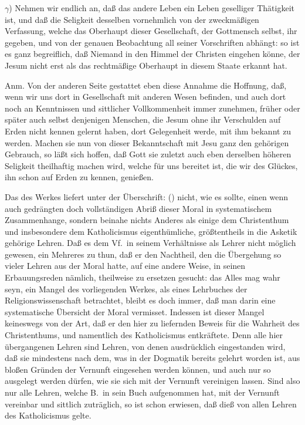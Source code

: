 {$\gamma$) Nehmen wir endlich an, daß das andere Leben ein Leben geselliger Thätigkeit ist, und daß die Seligkeit desselben vornehmlich von der zweckmäßigen Verfassung, welche das Oberhaupt dieser Gesellschaft, der Gottmensch selbst, ihr gegeben, und von der genauen Beobachtung all seiner Vorschriften abhängt: so ist es ganz begreiflich, daß Niemand in den Himmel der Christen eingehen könne, der Jesum nicht erst als das rechtmäßige Oberhaupt in diesem Staate erkannt hat. \par
Anm. Von der anderen Seite gestattet eben diese Annahme die Hoffnung, daß, wenn wir uns dort in Gesellschaft mit anderen Wesen befinden, und auch dort noch an Kenntnissen und sittlicher Vollkommenheit immer zunehmen, früher oder später auch selbst denjenigen Menschen, die Jesum ohne ihr Verschulden auf Erden nicht kennen gelernt haben, dort Gelegenheit werde, mit ihm bekannt zu werden. Machen sie nun von dieser Bekanntschaft mit Jesu ganz den gehörigen Gebrauch, so läßt sich hoffen, daß Gott sie zuletzt auch eben derselben höheren Seligkeit theilhaftig machen wird,  welche für uns bereitet ist, die wir des Glückes, ihn schon auf Erden zu kennen, genießen.} \par
\gliederungslinie\par
Das  des Werkes liefert unter der Überschrift:  () nicht, wie es sollte, einen wenn auch gedrängten doch vollständigen Abriß dieser Moral in systematischem Zusammenhange, sondern beinahe nichts Anderes als einige dem Christenthum und insbesondere dem Katholicismus eigenthümliche, größtentheils in die Asketik gehörige Lehren. Daß es dem Vf.\ in seinem Verhältnisse als Lehrer nicht möglich gewesen, ein Mehreres zu thun, daß er den Nachtheil, den die Übergehung so vieler Lehren aus der Moral hatte, auf eine andere Weise, in seinen Erbauungsreden nämlich, theilweise zu ersetzen gesucht: das Alles mag wahr seyn, ein Mangel des vorliegenden Werkes, als eines Lehrbuches der Religionswissenschaft betrachtet, bleibt es doch immer, daß man darin eine systematische Übersicht der Moral vermisset. Indessen ist dieser Mangel keineswegs von der Art, daß er den hier zu liefernden Beweis für die Wahrheit des Christenthums, und namentlich des Katholicismus entkräftete. Denn alle hier übergangenen Lehren sind Lehren, von denen ausdrücklich eingestanden wird, daß sie mindestens nach dem, was in der Dogmatik bereits gelehrt worden ist, aus bloßen Gründen der Vernunft eingesehen werden können, und auch nur so ausgelegt werden dürfen, wie sie sich mit der Vernunft vereinigen lassen. Sind also nur alle Lehren, welche B.\ in sein Buch aufgenommen hat, mit der Vernunft vereinbar und sittlich zuträglich, so ist schon erwiesen, daß dieß von allen Lehren des Katholicismus gelte. \par
